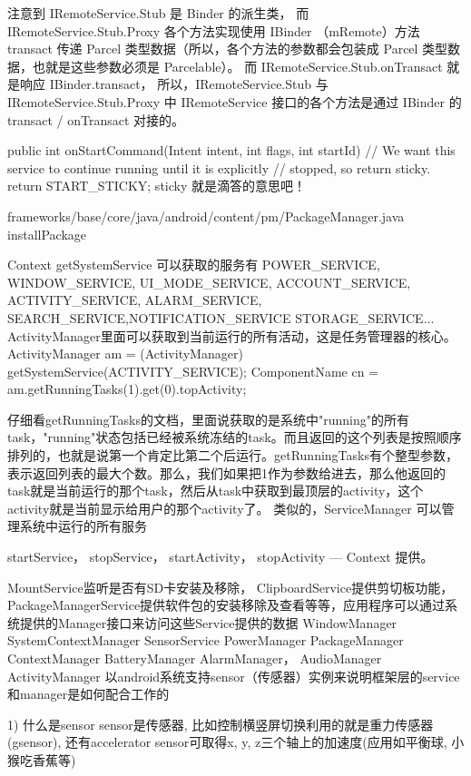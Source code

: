 \documentclass{book}
\begin{document}
\begin{CJK}{UTF8}{gbsn}
{注意到 IRemoteService.Stub 是 Binder 的派生类，  而 IRemoteService.Stub.Proxy
各个方法实现使用 IBinder （mRemote）方法 transact 传递 Parcel
类型数据（所以，各个方法的参数都会包装成 Parcel 类型数据，也就是这些参数必须是
Parcelable）。 而 IRemoteService.Stub.onTransact 就是响应 IBinder.transact，
所以，IRemoteService.Stub 与 IRemoteService.Stub.Proxy 中 IRemoteService
接口的各个方法是通过 IBinder 的 transact / onTransact 对接的。


   public int onStartCommand(Intent intent, int flags, int startId) {        
        // We want this service to continue running until it is explicitly
        // stopped, so return sticky.
        return START_STICKY;
    }
sticky 就是滴答的意思吧！


frameworks/base/core/java/android/content/pm/PackageManager.java
installPackage

Context getSystemService   可以获取的服务有   POWER_SERVICE, WINDOW_SERVICE, 
                                 UI_MODE_SERVICE, ACCOUNT_SERVICE, ACTIVITY_SERVICE, 
                                           ALARM_SERVICE, SEARCH_SERVICE,NOTIFICATION_SERVICE
                                           STORAGE_SERVICE...
ActivityManager里面可以获取到当前运行的所有活动，这是任务管理器的核心。
ActivityManager am = (ActivityManager) getSystemService(ACTIVITY_SERVICE);  
ComponentName cn = am.getRunningTasks(1).get(0).topActivity;  

仔细看getRunningTasks的文档，里面说获取的是系统中"running"的所有task，"running"状态包括已经被系统冻结的task。而且返回的这个列表是按照顺序排列的，也就是说第一个肯定比第二个后运行。getRunningTasks有个整型参数，表示返回列表的最大个数。那么，我们如果把1作为参数给进去，那么他返回的task就是当前运行的那个task，然后从task中获取到最顶层的activity，这个activity就是当前显示给用户的那个activity了。
类似的，ServiceManager 可以管理系统中运行的所有服务 

startService， stopService，  startActivity， stopActivity --- Context 提供。

MountService监听是否有SD卡安装及移除，
ClipboardService提供剪切板功能，
PackageManagerService提供软件包的安装移除及查看等等，应用程序可以通过系统提供的Manager接口来访问这些Service提供的数据
WindowManager
SystemContextManager
SensorService
PowerManager
PackageManager
ContextManager
BatteryManager
AlarmManager， AudioManager
ActivityManager
以android系统支持sensor（传感器）实例来说明框架层的service和manager是如何配合工作的

1)         什么是sensor
sensor是传感器, 比如控制横竖屏切换利用的就是重力传感器(gsensor), 还有accelerator sensor可取得x, y, z三个轴上的加速度(应用如平衡球, 小猴吃香蕉等)

}
\end{CJK}
\end{document}

